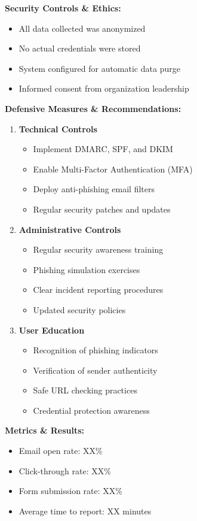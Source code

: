 \documentclass[12pt]{article}
\begin{document}
\textbf{Security Controls \& Ethics:}
\begin{itemize}
    \item All data collected was anonymized
    \item No actual credentials were stored
    \item System configured for automatic data purge
    \item Informed consent from organization leadership
\end{itemize}

\textbf{Defensive Measures \& Recommendations:}
\begin{enumerate}
    \item \textbf{Technical Controls}
    \begin{itemize}
        \item Implement DMARC, SPF, and DKIM
        \item Enable Multi-Factor Authentication (MFA)
        \item Deploy anti-phishing email filters
        \item Regular security patches and updates
    \end{itemize}

    \item \textbf{Administrative Controls}
    \begin{itemize}
        \item Regular security awareness training
        \item Phishing simulation exercises
        \item Clear incident reporting procedures
        \item Updated security policies
    \end{itemize}

    \item \textbf{User Education}
    \begin{itemize}
        \item Recognition of phishing indicators
        \item Verification of sender authenticity
        \item Safe URL checking practices
        \item Credential protection awareness
    \end{itemize}
\end{enumerate}

\textbf{Metrics \& Results:}
\begin{itemize}
    \item Email open rate: XX\%
    \item Click-through rate: XX\%
    \item Form submission rate: XX\%
    \item Average time to report: XX minutes
\end{itemize}
\end{document}
